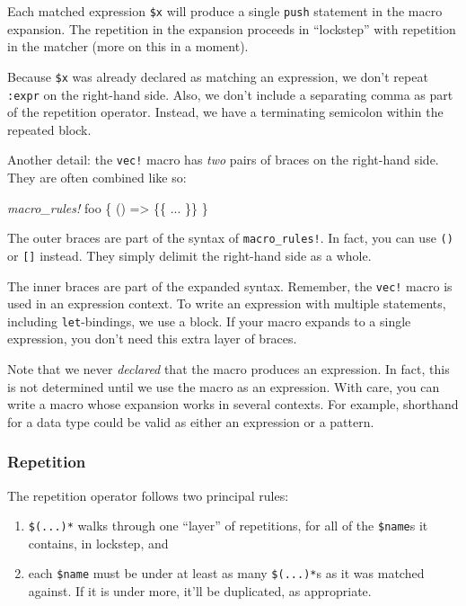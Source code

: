 \documentclass[a4paper,]{book}
\newenvironment{Shaded}{\begin{snugshade}}{\end{snugshade}}
\newcommand{\PreprocessorTok}[1]{\textcolor[rgb]{0.56,0.35,0.01}{\textit{{#1}}}}
\newcommand{\NormalTok}[1]{{#1}}
\providecommand{\tightlist}{%
  \setlength{\itemsep}{0pt}\setlength{\parskip}{0pt}}
\begin{document}
Each matched expression \texttt{\$x} will produce a single \texttt{push}
statement in the macro expansion. The repetition in the expansion
proceeds in ``lockstep'' with repetition in the matcher (more on this in
a moment).

Because \texttt{\$x} was already declared as matching an expression, we
don't repeat \texttt{:expr} on the right-hand side. Also, we don't
include a separating comma as part of the repetition operator. Instead,
we have a terminating semicolon within the repeated block.

Another detail: the \texttt{vec!} macro has \emph{two} pairs of braces
on the right-hand side. They are often combined like so:

\begin{Shaded}
\begin{Highlighting}[]
\PreprocessorTok{macro_rules!} \NormalTok{foo \{}
    \NormalTok{() => \{\{}
        \NormalTok{...}
    \NormalTok{\}\}}
\NormalTok{\}}
\end{Highlighting}
\end{Shaded}

The outer braces are part of the syntax of \texttt{macro\_rules!}. In
fact, you can use \texttt{()} or \texttt{{[}{]}} instead. They simply
delimit the right-hand side as a whole.

The inner braces are part of the expanded syntax. Remember, the
\texttt{vec!} macro is used in an expression context. To write an
expression with multiple statements, including \texttt{let}-bindings, we
use a block. If your macro expands to a single expression, you don't
need this extra layer of braces.

Note that we never \emph{declared} that the macro produces an
expression. In fact, this is not determined until we use the macro as an
expression. With care, you can write a macro whose expansion works in
several contexts. For example, shorthand for a data type could be valid
as either an expression or a pattern.

\subsubsection{Repetition}\label{repetition}

The repetition operator follows two principal rules:

\begin{enumerate}
\def\labelenumi{\arabic{enumi}.}
\tightlist
\item
  \texttt{\$(...)*} walks through one ``layer'' of repetitions, for all
  of the \texttt{\$name}s it contains, in lockstep, and
\item
  each \texttt{\$name} must be under at least as many \texttt{\$(...)*}s
  as it was matched against. If it is under more, it'll be duplicated,
  as appropriate.
\end{enumerate}
\end{document}

